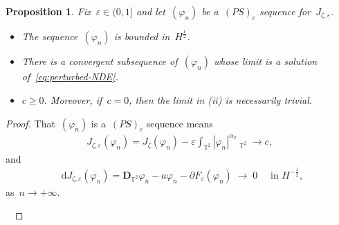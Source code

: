 \documentclass[10pt,a4paper]{amsart}
\newcommand{\T}{\mathbb{T}}
\newcommand{\dd}{\mathop{}\!\mathrm{d}}
\newcommand{\eps}{\varepsilon}
\newcommand{\pD}{\mathbf{D}}
\DeclareMathOperator{\dv}{\dd{vol}}
\newtheorem{prop}[thm]{Proposition}
\begin{document}
\begin{prop}\label{prop:PS}
    Fix~$\eps\in (0,1]$ and let~$(\varphi_n)$ be a~$(PS)_c$ sequence for~$J_{\zeta,\eps}$.
    \begin{itemize}
        \item[(i)] The sequence~$(\varphi_n)$ is bounded in~$H^{\frac{1}{2}}$.
        \item[(ii)] There is a convergent subsequence of~$(\varphi_n)$ whose limit is a solution of~\eqref{eq:perturbed-NDE}.
        \item[(iii)] $c\geq 0$. Moreover, if~$c=0$, then the limit in (ii) is necessarily trivial.
    \end{itemize}
\end{prop}

\begin{proof}
    That~$(\varphi_n)$ is a~$(PS)_c$ sequence means
    \begin{align}\label{eq:PS level}
        J_{\zeta,\eps}(\varphi_n)
        =J_\zeta(\varphi_n)- \eps\int_{\T^2} |\varphi_n|^{\alpha_2}\dv_{\T^2} \to c,
    \end{align}
    and
    \begin{align}\label{eq:PS differential}
        \dd J_{\zeta,\eps}(\varphi_n)=\pD_{\T^2}\varphi_n-a\varphi_n-\partial F_\eps(\varphi_n)\; \to \; 0
         \quad \mbox{ in } H^{-\frac{1}{2}},
    \end{align}
    as~$n\to+\infty$.


    \


\end{proof}
\end{document}
